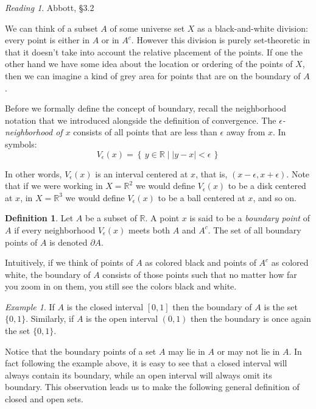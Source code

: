 \documentclass[11pt,oneside]{amsbook}
\newcommand{\set}[1]{\left\{\,#1\,\right\}}
\newcommand{\R}{\mathbb R}
\theoremstyle{definition}
\theoremstyle{plain}
\theoremstyle{definition}
\newtheorem{defn}[thm]{Definition}
\theoremstyle{remark}
\newtheorem{example}[thm]{Example}
\newtheorem*{reading}{Reading}
\numberwithin{equation}{section}
\numberwithin{figure}{section}
\begin{document}
\begin{reading}
  Abbott, \S 3.2
\end{reading}

We can think of a subset $A$ of some universe set $X$ as a black-and-white division: every point is either in $A$ or in $A^c$. However this division is purely set-theoretic in that it doesn't take into account the relative placement of the points. If one the other hand we have some idea about the location or ordering of the points of $X$, then we can imagine a kind of grey area for points that are on the boundary of $A$.

Before we formally define the concept of boundary, recall the neighborhood notation that we introduced alongside the definition of convergence. The \emph{$\epsilon$-neighborhood of $x$} consists of all points that are less than $\epsilon$ away from $x$. In symbols:
\[V_\epsilon(x)=\set{y\in\R\mid|y-x|<\epsilon}
\]

In other words, $V_\epsilon(x)$ is an interval centered at $x$, that is, $(x-\epsilon,x+\epsilon)$. Note that if we were working in $X=\R^2$ we would define $V_\epsilon(x)$ to be a disk centered at $x$, in $X=\R^3$ we would define $V_\epsilon(x)$ to be a ball centered at $x$, and so on.

\begin{defn}
  Let $A$ be a subset of $\R$. A point $x$ is said to be a \emph{boundary point} of $A$ if every neighborhood $V_\epsilon(x)$ meets both $A$ and $A^c$. The set of all boundary points of $A$ is denoted $\partial A$.
\end{defn}

Intuitively, if we think of points of $A$ as colored black and points of $A^c$ as colored white, the boundary of $A$ consists of those points such that no matter how far you zoom in on them, you still see the colors black and white.

\begin{example}
  If $A$ is the closed interval $[0,1]$ then the boundary of $A$ is the set $\{0,1\}$. Similarly, if $A$ is the open interval $(0,1)$ then the boundary is once again the set $\{0,1\}$.
\end{example}

Notice that the boundary points of a set $A$ may lie in $A$ or may not lie in $A$. In fact following the example above, it is easy to see that a closed interval will always contain its boundary, while an open interval will always omit its boundary. This observation leads us to make the following general definition of closed and open sets.
\end{document}
